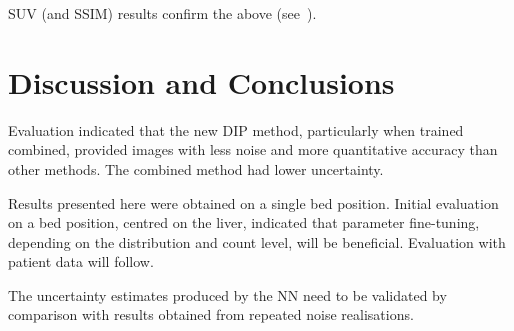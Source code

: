             \gls{SUV} (and \gls{SSIM}) results confirm the above (see~).
        
        
        \section{Discussion and Conclusions} \label{sec:pseudo_bayesian_dip_denoising_as_a_preprocessing_step_for_kinetic_modelling_in_dynamic_pet_appendix_discussion_and_conclusions}
        
            Evaluation indicated that the new \gls{DIP} method, particularly when trained combined, provided images with less noise and more quantitative accuracy than other methods. The combined method had lower uncertainty.
        
            Results presented here were obtained on a single bed position. Initial evaluation on a bed position, centred on the liver, indicated that parameter fine-tuning, depending on the distribution and count level, will be beneficial. Evaluation with patient data will follow.
            
            The uncertainty estimates produced by the \gls{NN} need to be validated by comparison with results obtained from repeated noise realisations.
            
